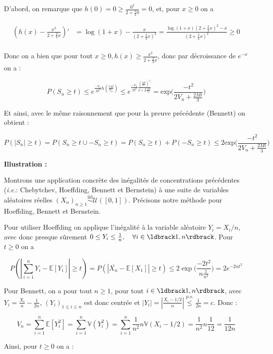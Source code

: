 \documentclass[12pt]{article}
\newcommand{\petitespace}{\vspace{0.5cm}}
\newcommand{\cercler}[1]{\tikz[baseline=(char.base)]{\node[shape=circle,draw,inner sep=1pt](char){#1};} }
\newcommand{\bb}[1]{\mathbb{#1}} %
\newcommand{\ie}{\textit{i.e.}}
\newcommand{\somme}[2]{\sum\limits_{#1}^{#2}}
\renewcommand{\cal}{\mathcal}
\newcommand{\esp}[1]{\bb{ E} \mathopen{}\left[#1\right]} %
\newcommand{\Var}[1]{\bb{ V} \mathopen{}\left(#1\right)} %
\newcommand{\simiid}{\overset{\text{iid}}{\sim}}
\newcommand{\1}{\bb{1}} %
\newcommand{\Xbarre}{\overline{X_n}}
\begin{document}
{D'abord, on remarque que $h(0) = 0 \ge \frac{0^2}{2+\frac{2}{3}0} = 0$, et, pour $x \ge 0$ on a 

\begin{align*}
	(h(x)- \frac{x^2}{2+\frac{2}{3}x})'&= \log(1+x) - \frac{x}{(2+\frac 23x)^2}  = \frac{\log(1+x)(2+\frac 23x)^2-x}{(2+\frac 23x)^2} \ge 0 \\
\end{align*}

Donc on a bien que pour tout $x \ge 0, h(x) \ge \frac{x^2}{2+\frac{2}{3}x}$, donc par décroissance de $e^{-x}$ on a : 

$$ P(S_n \ge t) \le e^{\frac{-V_n}{M^2} h(\frac{tM}{V_n})} \le e^{ \frac{-V_n}{M^2}\frac{(\frac{tM}{V_n})^2}{2+\frac{2}{3}\frac{tM}{V_n}} } = \text{exp}\big(\frac{-t^2}{2V_n + \frac{2Mt}{3}}\big)$$

Et ainsi, avec le même raisonnement que pour la preuve précédente (Bennett) on obtient :

$$ P( |S_n| \ge t) = P(S_n \ge t \cup -S_n \ge t) = P(S_n \ge t) + P(-S_n \ge t) \le 2 \text{exp}\big(\frac{-t^2}{2V_n + \frac{2Mt}{3}}\big) $$

%


\petitespace}

\textbf{Illustration :}

Montrons une application concrète des inégalités de concentrations précédentes (\ie : Chebytchev, Hoeffding, Bennett et Bernstein) à une suite de variables aléatoires réelles $(X_n)_{n \ge 1} \simiid \cal U([0,1])$. Précisons notre méthode pour Hoeffding, Bennett et Bernstein.

\cercler 1 Pour utiliser Hoeffding on applique l'inégalité à la variable aléatoire $Y_i = X_i/n$, avec donc presque sûrement $0 \le Y_i \le \frac 1n, \quad \forall i \in \ldbrack 1,n\rdbrack$. Pour $t \ge 0$ on a 

$$ P(|\somme{i=1}{n} Y_i-\esp{Y_i} |\ge t)=P(|\Xbarre -\esp{X_1}| \ge t ) \le 2 \exp\big(\frac{-2t^2}{n \frac{1}{n^2}}\big) = 2 e^{-2nt^2}$$

\cercler 2 Pour Bennett, on a pour tout $n \ge 1$, pour tout $i \in \ldbrack 1,n\rdbrack$, avec $Y_i = \frac{X_i}{n}-\frac{1}{2n}$, $(Y_i)_{1 \le i\le n}$ est donc centrée et $| Y_i| = |\frac{X_i-1/2}{n}| \overset{p.s.}{\le} \frac{1}{2n}=c$. Donc :

$$V_n = \somme{i=1}{n} \esp{Y_i^2} = \somme{i=1}{n} \Var{Y_i^2} =   \somme{i=1}{n} \frac{1}{n^2}n\Var{X_i-1/2} = \frac{1}{n^2}n\frac{1}{12} = \frac{1}{12n}$$

Ainsi, pour $t \ge 0$ on a :
\end{document}
